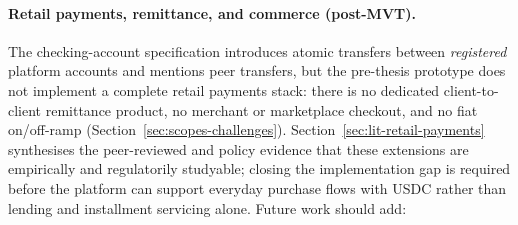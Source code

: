 \documentclass[12pt,a4paper]{report}
\begin{document}
\paragraph{Retail payments, remittance, and commerce (post-MVT).}
\label{sec:future-retail-payments}

The checking-account specification introduces atomic transfers between \emph{registered} platform accounts and mentions peer transfers, but the pre-thesis prototype does not implement a complete retail payments stack: there is no dedicated client-to-client remittance product, no merchant or marketplace checkout, and no fiat on/off-ramp (Section~\ref{sec:scopes-challenges}). Section~\ref{sec:lit-retail-payments} synthesises the peer-reviewed and policy evidence that these extensions are empirically and regulatorily studyable; closing the implementation gap is required before the platform can support everyday purchase flows with USDC rather than lending and installment servicing alone. Future work should add:
\end{document}

